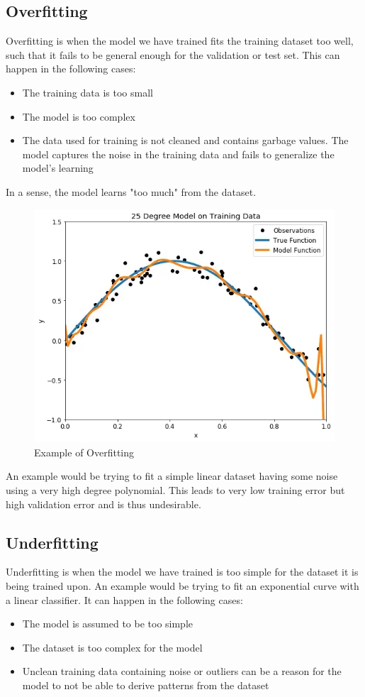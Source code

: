 \documentclass[12pt]{article}
\begin{document}
\subsection{Overfitting}
\noindent Overfitting is when the model we have trained fits the training dataset too well, such that it fails to be general enough for the validation or test set. This can happen in the following cases:
\begin{itemize}
    \item The training data is too small
    \item The model is too complex
    \item The data used for training is not cleaned and contains garbage values. The model captures the noise in the training data and fails to generalize the model's learning
\end{itemize}

\noindent In a sense, the model learns "too much" from the dataset.\\

\begin{figure}[H]
    \centering
    \includegraphics[width=.5\textwidth]{Overfit.jpg}
    \caption{Example of Overfitting}
    \label{Figure 2}
\end{figure}

\noindent An example would be trying to fit a simple linear dataset having some noise using a very high degree polynomial. This leads to very low training error but high validation error and is thus undesirable.\\

\subsection{Underfitting}
\noindent Underfitting is when the model we have trained is too simple for the dataset it is being trained upon. An example would be trying to fit an exponential curve with a linear classifier. It can happen in the following cases:
\begin{itemize}
    \item The model is assumed to be too simple
    \item The dataset is too complex for the model
    \item Unclean training data containing noise or outliers can be a reason for the model to not be able to derive patterns from the dataset
\end{itemize}
\end{document}
